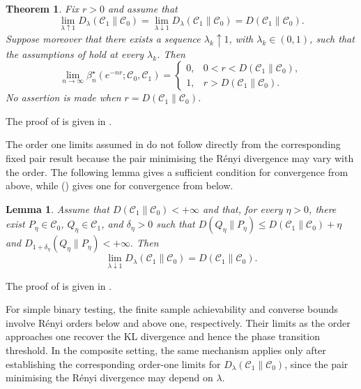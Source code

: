 \documentclass[journal,10pt,draftclsnofoot,onecolumn]{IEEEtran}
\newtheorem{theorem}{Theorem}
\newtheorem{lemma}{Lemma}
\begin{document}
\begin{theorem}
\label{cor:threshold-rate}
Fix $r>0$ and assume that
\begin{equation*} 
\lim_{\lambda\uparrow1}D_\lambda(\mathcal C_1\|\mathcal C_0) = \lim_{\lambda\downarrow1}D_\lambda(\mathcal C_1\|\mathcal C_0) = D(\mathcal C_1\|\mathcal C_0).
\end{equation*} 
Suppose moreover that there exists a sequence $\lambda_k\uparrow1$, with $\lambda_k\in(0,1)$, such that the assumptions of  hold at every $\lambda_k$. Then
\begin{equation} 
\lim_{n\to\infty}\beta_n^\star(e^{-nr};\mathcal C_0,\mathcal C_1) = \begin{cases} 0, & 0<r<D(\mathcal C_1\|\mathcal C_0),\\ 1, & r>D(\mathcal C_1\|\mathcal C_0).
\end{cases}
\label{eq:threshold-KL}
\end{equation}
No assertion is made when $r=D(\mathcal C_1\|\mathcal C_0)$.
\end{theorem}
The proof of  is given in .

The order one limits assumed in  do not follow directly from the corresponding fixed pair result because the pair minimising the R\'enyi divergence may vary with the order. The following lemma gives a sufficient condition for convergence from above, while  () gives one for convergence from below.

\begin{lemma}
\label{lem:composite-renyi-order-one}
Assume that $D(\mathcal C_1\|\mathcal C_0)<+\infty$ and that, for every $\eta>0$, there exist $P_\eta\in\mathcal C_0$, $Q_\eta\in\mathcal C_1$, and $\delta_\eta>0$ such that $D(Q_\eta\|P_\eta) \leq D(\mathcal C_1\|\mathcal C_0)+\eta $ and $D_{1+\delta_\eta}(Q_\eta\|P_\eta)<+\infty.$ Then
\begin{equation*}
\lim_{\lambda\downarrow1} D_\lambda(\mathcal C_1\|\mathcal C_0) = D(\mathcal C_1\|\mathcal C_0).
\end{equation*}
\end{lemma}
The proof of  is given in .

For simple binary testing, the finite sample achievability and converse bounds involve R\'enyi orders below and above one, respectively\cite{bruno2026finite}. Their limits as the order approaches one recover the KL divergence and hence the phase transition threshold. In the composite setting, the same mechanism applies only after establishing the corresponding order-one limits for $D_\lambda(\mathcal C_1\|\mathcal C_0)$, since the pair minimising the R\'enyi divergence may depend on $\lambda$.
\end{document}
